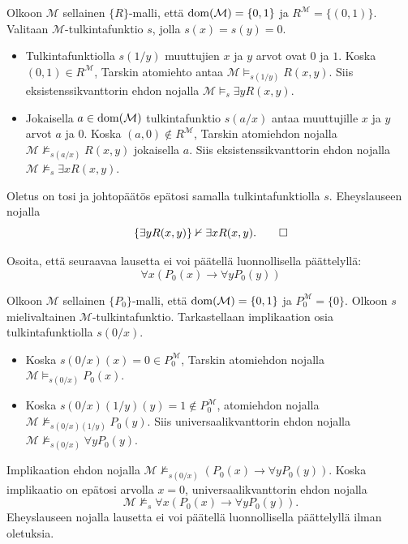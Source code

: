 \documentclass[11pt,a4paper]{amsart}
\begin{document}
\begin{solution}
  Olkoon \(\mathcal M\) sellainen \(\{R\}\)-malli, että
  \(\operatorname{dom}(\mathcal M)=\{0,1\}\) ja \(R^{\mathcal M}=\{(0,1)\}\).
  Valitaan \(\mathcal M\)-tulkintafunktio \(s\), jolla \(s(x)=s(y)=0\).
  \begin{itemize}
    \item Tulkintafunktiolla \(s(1/y)\) muuttujien \(x\) ja \(y\) arvot ovat
      \(0\) ja \(1\). Koska \((0,1)\in R^{\mathcal M}\), Tarskin
      atomiehto antaa \(\mathcal M\models_{s(1/y)}R(x,y)\). Siis
      eksistenssikvanttorin ehdon nojalla
      \(\mathcal M\models_s\exists yR(x,y)\).
    \item Jokaisella \(a\in\operatorname{dom}(\mathcal M)\) tulkintafunktio \(s(a/x)\)
      antaa muuttujille \(x\) ja \(y\) arvot \(a\) ja \(0\). Koska
      \((a,0)\notin R^{\mathcal M}\), Tarskin atomiehdon nojalla
      \(\mathcal M\not\models_{s(a/x)}R(x,y)\) jokaisella \(a\). Siis
      eksistenssikvanttorin ehdon nojalla
      \(\mathcal M\not\models_s\exists xR(x,y)\).
  \end{itemize}
  Oletus on tosi ja johtopäätös epätosi samalla tulkintafunktiolla \(s\).
  Eheyslauseen nojalla
  \[
    \{\exists yR(x,y)\}\nvdash\exists xR(x,y).\qedhere
  \]
\end{solution}

\begin{exercise}
  Osoita, että seuraavaa lausetta ei voi päätellä luonnollisella päättelyllä:
  \[
    \forall x(P_0(x) \to \forall yP_0(y))
  \]
\end{exercise}

\begin{solution}
  Olkoon \(\mathcal M\) sellainen \(\{P_0\}\)-malli, että
  \(\operatorname{dom}(\mathcal M)=\{0,1\}\) ja \(P_0^{\mathcal M}=\{0\}\).
  Olkoon \(s\) mielivaltainen \(\mathcal M\)-tulkintafunktio.
  Tarkastellaan implikaation osia tulkintafunktiolla \(s(0/x)\).
  \begin{itemize}
    \item Koska \(s(0/x)(x)=0\in P_0^{\mathcal M}\), Tarskin atomiehdon
      nojalla \(\mathcal M\models_{s(0/x)}P_0(x)\).
    \item Koska \(s(0/x)(1/y)(y)=1\notin P_0^{\mathcal M}\), atomiehdon
      nojalla \(\mathcal M\not\models_{s(0/x)(1/y)}P_0(y)\). Siis
      universaalikvanttorin ehdon nojalla
      \(\mathcal M\not\models_{s(0/x)}\forall yP_0(y)\).
  \end{itemize}
  Implikaation ehdon nojalla
  \(\mathcal M\not\models_{s(0/x)}(P_0(x)\to\forall yP_0(y))\).
  Koska implikaatio on epätosi arvolla \(x=0\), universaalikvanttorin
  ehdon nojalla
  \[
    \mathcal M\not\models_s\forall x(P_0(x)\to\forall yP_0(y)).
  \]
  Eheyslauseen nojalla lausetta ei voi päätellä luonnollisella päättelyllä
  ilman oletuksia.
\end{solution}
\end{document}
